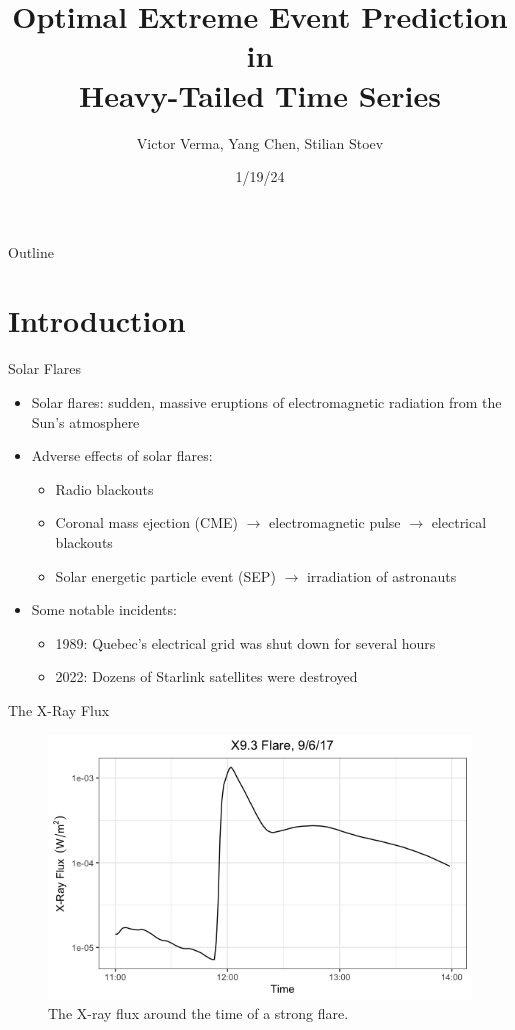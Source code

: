 \documentclass{beamer}
\title[Optimal Extreme Event Prediction \ldots]{Optimal Extreme Event Prediction in \\ Heavy-Tailed Time Series}
\author{Victor Verma, Yang Chen, Stilian Stoev}
\institute[]
{
Department of Statistics \\
University of Michigan
}
\date[1/19/24]{1/19/24}
\begin{document}
\begin{frame}
    \titlepage
\end{frame}

\begin{frame}{Outline}
   \tableofcontents
\end{frame}

\section{Introduction}

\begin{frame}{Solar Flares}
    \begin{itemize}
        \item Solar flares: sudden, massive eruptions of electromagnetic radiation from the Sun's atmosphere
        \item Adverse effects of solar flares: 
        \begin{itemize}
            \item Radio blackouts
            \item Coronal mass ejection (CME) $\rightarrow$ electromagnetic pulse $\rightarrow$ electrical blackouts
            \item Solar energetic particle event (SEP) $\rightarrow$ irradiation of astronauts
        \end{itemize}
        \item Some notable incidents:
        \begin{itemize}
            \item 1989: Quebec's electrical grid was shut down for several hours
            \item 2022: Dozens of Starlink satellites were destroyed
        \end{itemize}
    \end{itemize}
\end{frame}

\begin{frame}{The X-Ray Flux}
    \begin{figure}
        \centering
        \includegraphics[scale=0.5]{flare_flux_example.png}
        \caption{The X-ray flux around the time of a strong flare.}
        \label{fig:flare_flux_example}
    \end{figure}
\end{frame}
\end{document}
